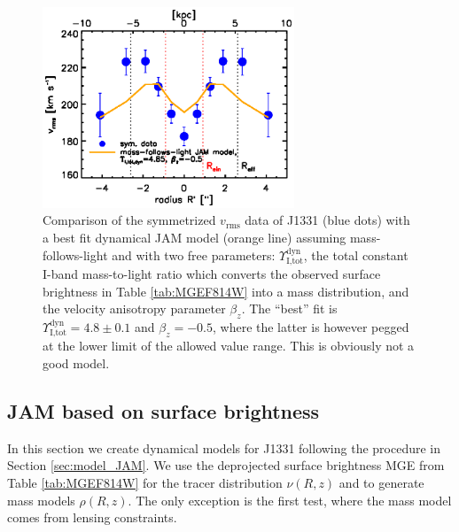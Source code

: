 \documentclass[useAMS,usenatbib]{mnras}
\begin{document}
\begin{figure}
  \centering
  \includegraphics[height=6cm]{fig/jam_A2_vrms.ps}
  \caption{Comparison of the symmetrized $v_\text{rms}$ data of J1331 (blue dots) with a best fit dynamical JAM model (orange line) assuming mass-follows-light and with two free parameters: $\Upsilon_\text{I,tot}^\text{dyn}$, the total constant I-band mass-to-light ratio which converts the observed surface brightness in Table \ref{tab:MGEF814W} into a mass distribution, and the velocity anisotropy parameter $\beta_z$. The ``best'' fit is $\Upsilon_\text{I,tot}^\text{dyn} = 4.8 \pm 0.1$ and $\beta_z = -0.5$, where the latter is however pegged at the lower limit of the allowed value range. This is obviously not a good model.}
  \label{fig:JAM_modelA2}
\end{figure}


\subsection{JAM based on surface brightness} \label{sec:results_JAM_SB}

In this section we create dynamical models for J1331 following the procedure in Section \ref{sec:model_JAM}. We use the deprojected surface brightness MGE from Table \ref{tab:MGEF814W} for the tracer distribution $\nu(R,z)$ and to generate mass models $\rho(R,z)$. The only exception is the first test, where the mass model comes from lensing constraints.
\end{document}
